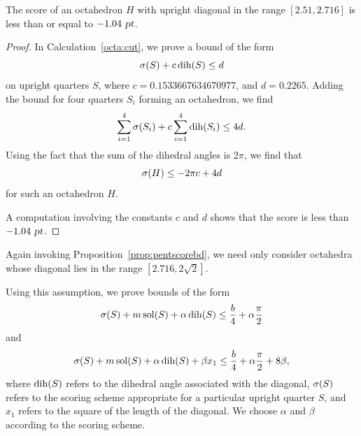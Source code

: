 \begin{lem}
\label{lem:octa:2716}
The score of an octahedron $H$ with upright diagonal in the range $[2.51, 2.716]$
is less than or equal to $-1.04 \text{ \sl pt}$.
\end{lem}

\begin{proof}
In Calculation~\ref{octa:cut},
we prove a bound of the form
\[
\operatorname{\sigma}(S) + c \operatorname{dih}(S) \le d
\]
on upright quarters $S$, where $c = 0.1533667634670977$, and
$d = 0.2265$.  Adding the bound for four quarters $S_i$ forming
an octahedron, we find
\[
\sum_{i=1}^4 \operatorname{\sigma}(S_i) + c \sum_{i=1}^4 \operatorname{dih}(S_i) \le 4 d.
\]
Using the fact that the sum of the dihedral angles is $2 \pi$,
we find that
\[
\operatorname{\sigma}(H) \le -2 \pi c + 4 d
\]
for such an octahedron $H$.

A computation involving the constants $c$ and $d$ shows that the
score is less than $-1.04 \text{ \sl pt}$.
\end{proof}

Again invoking
Proposition~\ref{prop:pentscorebd}, we need only
consider octahedra whose diagonal lies in the range
$[2.716, 2\sqrt{2}]$.


Using this assumption, we prove bounds of the form
\begin{equation}
\operatorname{\sigma}(S) + m \operatorname{sol}(S) + \alpha \operatorname{dih}(S)  \le \frac{b}{4} +
    \alpha \frac{\pi}{2}
\label{octa:dih}
\end{equation}
and
\begin{equation}
\operatorname{\sigma}(S) + m \operatorname{sol}(S) + \alpha \operatorname{dih}(S) + \beta x_1 \le \frac{b}{4} +
    \alpha \frac{\pi}{2} + 8 \beta,
\label{octa:edge}
\end{equation}
where $\operatorname{dih}(S)$ refers to the dihedral angle associated with the diagonal,
$\operatorname{\sigma}(S)$ refers to the scoring scheme appropriate for a
particular upright quarter $S$, and $x_1$ refers to the square of the length of
the diagonal.  We
choose $\alpha$ and $\beta$ according to the scoring scheme.

